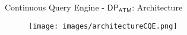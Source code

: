 \begin{comment}
\begin{frame}[fragile]{$\mathsf{DP_{ATM}}$ - Filter Stage}
\begin{itemize}
    \item Card cloning fraud pattern algorithmic evaluation
\end{itemize}
    \scalebox{0.9}{ 
    \hspace{-0.7cm}
    \begin{minipage}{1.2\textwidth} 
    \begin{algorithm}[H]
        \caption{\texttt{checkFraud}($\mathsf{S_c, e_{new}}$)}
        \label{alg:check-fraud-impl}
        \begin{algorithmic}[1]
            \Require $\mathsf{S_c}$ is a non-empty subgraph of interaction edges of card $\mathsf{c}$, 
            $\mathsf{e_{new}}$ is the \texttt{Edge} related to the new incoming opening interaction \texttt{EdgeStart} of card $\mathsf{c}$
            \State $\mathsf{e_{last}} \gets S_c[|S_c| - 1]$ \Comment{Retrieve last edge from $\mathsf{S_c}$}
            \If{$\mathsf{e_{last}}.\texttt{Tx\_end}$ is empty}
                \State \texttt{LOG: Warning: A tx ($\mathsf{e_{new}}$) starts before the previous ($\mathsf{e_{last}}$) ends!}
                \Return
            \EndIf
            \If{$\mathsf{e_{last}}.\texttt{ATM\_id} \neq \mathsf{e_{new}}.\texttt{ATM\_id}$}
                \State $\texttt{t\_min} \gets \text{obtainTmin}(\mathsf{e_{last}}, \mathsf{e_{new}})$
                \State $\texttt{t\_diff} \gets \mathsf{e_{new}}.\texttt{Tx\_start} - \mathsf{e_{last}}.\texttt{Tx\_end}$
                \If{$\texttt{t\_diff} < \texttt{t\_min}$}   
                    \State $\text{emitAlert}(\mathsf{e_{last}}, \mathsf{e_{new}})$
                \EndIf
            \EndIf
        \end{algorithmic}
    \end{algorithm}
    \end{minipage}
    }
\end{frame}
\end{comment}

\begin{comment}
\begin{frame}{$\mathsf{DP_{ATM}}$ - Filter Stage}
    \begin{itemize}
         \item \textbf{Filter \emph{worker}}.
         \item Simultaneously (many possible) different continuous query patterns: $FP_1, FP_2, ..., FP_n$.
    \end{itemize}

    \begin{figure}
        \centering
        \texttt{[image: figures/engine-filter-worker-1.png]}
   \end{figure}
\end{frame}
\end{comment}

\begin{frame}{Continuous Query Engine - $\mathsf{DP_{ATM}}$: Architecture}
\begin{figure}
    \centering
    \hspace*{-1cm}
    \texttt{[image: images/architectureCQE.png]}
\end{figure}
\end{frame}
